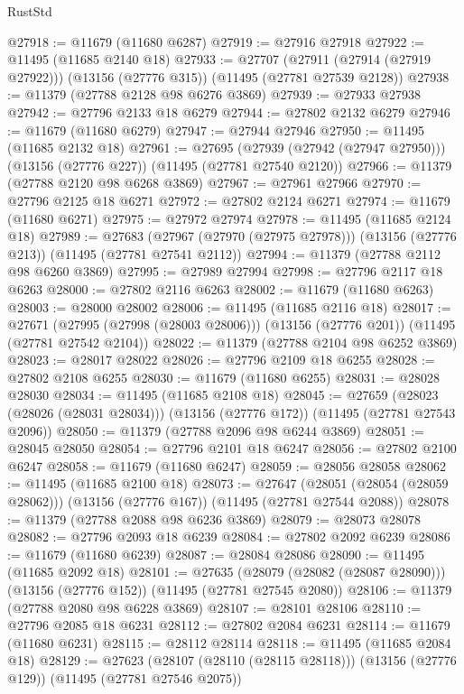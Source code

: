 \begin{lexlean}{RustStd}
\begin{coremodule}
@27918 := @11679 (@11680 @6287)
@27919 := @27916 @27918
@27922 := @11495 (@11685 @2140 @18)
@27933 := @27707
    (@27911 (@27914 (@27919 @27922)))
    (@13156 (@27776 @315))
    (@11495 (@27781 @27539 @2128))
@27938 := @11379 (@27788 @2128 @98 @6276 @3869)
@27939 := @27933 @27938
@27942 := @27796 @2133 @18 @6279
@27944 := @27802 @2132 @6279
@27946 := @11679 (@11680 @6279)
@27947 := @27944 @27946
@27950 := @11495 (@11685 @2132 @18)
@27961 := @27695
    (@27939 (@27942 (@27947 @27950)))
    (@13156 (@27776 @227))
    (@11495 (@27781 @27540 @2120))
@27966 := @11379 (@27788 @2120 @98 @6268 @3869)
@27967 := @27961 @27966
@27970 := @27796 @2125 @18 @6271
@27972 := @27802 @2124 @6271
@27974 := @11679 (@11680 @6271)
@27975 := @27972 @27974
@27978 := @11495 (@11685 @2124 @18)
@27989 := @27683
    (@27967 (@27970 (@27975 @27978)))
    (@13156 (@27776 @213))
    (@11495 (@27781 @27541 @2112))
@27994 := @11379 (@27788 @2112 @98 @6260 @3869)
@27995 := @27989 @27994
@27998 := @27796 @2117 @18 @6263
@28000 := @27802 @2116 @6263
@28002 := @11679 (@11680 @6263)
@28003 := @28000 @28002
@28006 := @11495 (@11685 @2116 @18)
@28017 := @27671
    (@27995 (@27998 (@28003 @28006)))
    (@13156 (@27776 @201))
    (@11495 (@27781 @27542 @2104))
@28022 := @11379 (@27788 @2104 @98 @6252 @3869)
@28023 := @28017 @28022
@28026 := @27796 @2109 @18 @6255
@28028 := @27802 @2108 @6255
@28030 := @11679 (@11680 @6255)
@28031 := @28028 @28030
@28034 := @11495 (@11685 @2108 @18)
@28045 := @27659
    (@28023 (@28026 (@28031 @28034)))
    (@13156 (@27776 @172))
    (@11495 (@27781 @27543 @2096))
@28050 := @11379 (@27788 @2096 @98 @6244 @3869)
@28051 := @28045 @28050
@28054 := @27796 @2101 @18 @6247
@28056 := @27802 @2100 @6247
@28058 := @11679 (@11680 @6247)
@28059 := @28056 @28058
@28062 := @11495 (@11685 @2100 @18)
@28073 := @27647
    (@28051 (@28054 (@28059 @28062)))
    (@13156 (@27776 @167))
    (@11495 (@27781 @27544 @2088))
@28078 := @11379 (@27788 @2088 @98 @6236 @3869)
@28079 := @28073 @28078
@28082 := @27796 @2093 @18 @6239
@28084 := @27802 @2092 @6239
@28086 := @11679 (@11680 @6239)
@28087 := @28084 @28086
@28090 := @11495 (@11685 @2092 @18)
@28101 := @27635
    (@28079 (@28082 (@28087 @28090)))
    (@13156 (@27776 @152))
    (@11495 (@27781 @27545 @2080))
@28106 := @11379 (@27788 @2080 @98 @6228 @3869)
@28107 := @28101 @28106
@28110 := @27796 @2085 @18 @6231
@28112 := @27802 @2084 @6231
@28114 := @11679 (@11680 @6231)
@28115 := @28112 @28114
@28118 := @11495 (@11685 @2084 @18)
@28129 := @27623
    (@28107 (@28110 (@28115 @28118)))
    (@13156 (@27776 @129))
    (@11495 (@27781 @27546 @2075))

\end{coremodule}
\end{lexlean}
